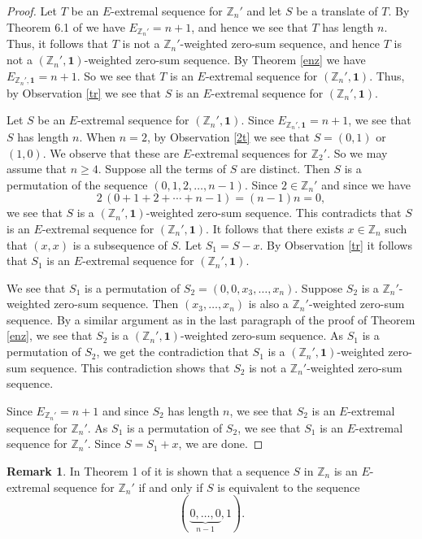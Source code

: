 \documentclass{article}[11pt]
\theoremstyle{definition}
\newtheorem{remark}[theorem]{Remark}
\begin{document}
\begin{proof}
Let $T$ be an $E$-extremal sequence for $\mathbb Z_n'$ and let $S$ be a translate of $T$. By Theorem 6.1 of \cite{ACFKP} we have $E_{\mathbb Z_n'}=n+1$, and hence we see that $T$ has length $n$. Thus, it follows that $T$ is not a $\mathbb Z_n'$-weighted zero-sum sequence, and hence $T$ is not a $(\mathbb Z_n',\mathbf 1)$-weighted zero-sum sequence. By Theorem \ref{enz} we have $E_{\mathbb Z_n',\mathbf 1}=n+1$. So we see that $T$ is an $E$-extremal sequence for $(\mathbb Z_n',\mathbf 1)$. Thus, by Observation \ref{tr} we see that $S$ is an $E$-extremal sequence for $(\mathbb Z_n',\mathbf 1)$.

Let $S$ be an $E$-extremal sequence for $(\mathbb Z_n',\mathbf 1)$. Since $E_{\mathbb Z_n',\mathbf 1}=n+1$, we see that $S$ has length $n$. When $n=2$, by Observation \ref{2t} we see that $S=(0,1)$ or $(1,0)$. We observe that these are $E$-extremal sequences for $\mathbb Z_2'$. So we may assume that $n\geq 4$. Suppose all the terms of $S$ are distinct. Then $S$ is a permutation of the sequence $(0,1,2,\ldots,n-1)$. Since $2\in \mathbb Z_n'$ and since we have
\[2\,(0+1+2+\cdots+n-1)=(n-1)n=0,\]
we see that $S$ is a $(\mathbb Z_n',\mathbf 1)$-weighted zero-sum sequence. This contradicts that $S$ is an $E$-extremal sequence for $(\mathbb Z_n',\mathbf 1)$. It follows that there exists $x\in \mathbb Z_n$ such that $(x,x)$ is a subsequence of $S$. Let $S_1=S-x$. By Observation \ref{tr} it follows that $S_1$ is an $E$-extremal sequence for $(\mathbb Z_n',\mathbf 1)$.

We see that $S_1$ is a permutation of $S_2=(0,0,x_3,\ldots,x_n)$. Suppose $S_2$ is a $\mathbb Z_n'$-weighted zero-sum sequence. Then $(x_3,\ldots,x_n)$ is also a $\mathbb Z_n'$-weighted zero-sum sequence. By a similar argument as in the last paragraph of the proof of Theorem \ref{enz}, we see that $S_2$ is a $(\mathbb Z_n',\mathbf 1)$-weighted zero-sum sequence. As $S_1$ is a permutation of $S_2$, we get the contradiction that $S_1$ is a $(\mathbb Z_n',\mathbf 1)$-weighted zero-sum sequence. This contradiction shows that $S_2$ is not a $\mathbb Z_n'$-weighted zero-sum sequence.

Since $E_{\mathbb Z_n'}=n+1$ and since $S_2$ has length $n$, we see that $S_2$ is an $E$-extremal sequence for $\mathbb Z_n'$. As $S_1$ is a permutation of $S_2$, we see that $S_1$ is an $E$-extremal sequence for $\mathbb Z_n'$. Since $S=S_1+x$, we are done.
\end{proof}


\begin{remark}
In Theorem 1 of \cite{AMP} it is shown that a sequence $S$ in $\mathbb Z_n$ is an $E$-extremal sequence for $\mathbb Z_n'$ if and only if $S$ is equivalent to the sequence
\[(\,\underbrace{0,\ldots,0}_\text{$n-1$},1).\]
\end{remark}
\end{document}
